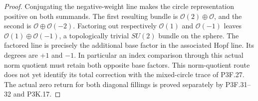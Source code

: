 \begin{proof}
Conjugating the negative-weight line makes the circle representation positive on both summands. The first resulting bundle is \(\mathcal O(2)\oplus\mathcal O\), and the second is \(\mathcal O\oplus\mathcal O(-2)\). Factoring out respectively \(\mathcal O(1)\) and \(\mathcal O(-1)\) leaves \(\mathcal O(1)\oplus\mathcal O(-1)\), a topologically trivial \(SU(2)\) bundle on the sphere. The factored line is precisely the additional base factor in the associated Hopf line. Its degrees are \(+1\) and \(-1\). In particular an index comparison through this actual norm quotient must retain both opposite base factors. This norm-quotient route does not yet identify its total correction with the mixed-circle trace of P3F.27. The actual zero return for both diagonal fillings is proved separately by P3F.31--32 and P3K.17.
\end{proof}
